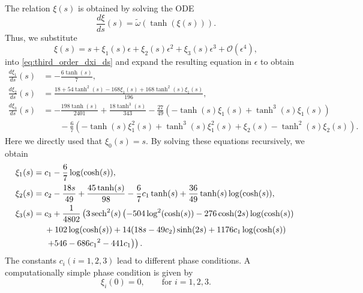 The relation $\xi(s)$ is obtained by solving the ODE
\begin{equation}
				\label{eq:third_order_dxi_ds}
				\frac{d\xi}{ds}(s) = \tilde \omega(\tanh(\xi(s))).
\end{equation}
Thus, we substitute 
\begin{equation*}
				\xi(s) = s + \xi_1(s)\epsilon + \xi_2(s)\epsilon^2
				+ \xi_3(s)\epsilon^3 + \mathcal{O}(\epsilon^4),
\end{equation*}
into \cref{eq:third_order_dxi_ds} and expand the resulting equation in
$\epsilon$ to obtain
\begin{align}
				\frac{d\xi_1}{ds}(s) &= -\frac{6\tanh(s)}{7}, 
            \label{eq:xi_1} \\
				\frac{d\xi_2}{ds}(s) &= \frac{18+54\tanh^2(s)
				-168\xi_1(s)+168\tanh^2(s)\xi_1(s)}{196},
            \label{eq:xi_2} \\
				\frac{d\xi_3}{ds}(s) &= -\frac{198 \tanh(s)}{2401}+
				\frac{18 \tanh^3(s)}{343}-\frac{27}{49}
				(-\tanh(s) \xi_1(s)+\tanh^3(s) \xi_1(s)) \nonumber \\
						& \qquad-\frac{6}{7} (-\tanh(s)
				\xi_1^2(s)+\tanh^3(s) \xi_1^2(s)+\xi_2(s)-\tanh^2(s) \xi_2(s)).
            \nonumber
\end{align}
Here we directly used that $\xi_0(s)=s$. By solving these equations recursively,
we obtain
\begin{equation*}
\begin{aligned}
    \xi_1(s) ={}& c_1 - \frac{6}{7}\log(\cosh(s)), \\
    \xi_2(s) ={}& c_2 -\frac{18 s}{49}+\frac{45 \tanh (s)}{98}-\frac{6}{7} c_1
             \tanh (s)+\frac{36}{49} \tanh (s) \log (\cosh(s)), \\
    \xi_3(s) ={}& c_3 + \frac{1}{4802}\left( 3 \operatorname{sech}^2(s) \left(-504 \log^2(\cosh
            (s))-276 \cosh (2 s) \log (\cosh (s)) \right.\right. \\
            {}& + 102 \log (\cosh (s))+14 (18 s-49 c_2) \sinh (2 s)+1176
                c_1 \log (\cosh (s)) \\
            {}& \left. \left. + 546-686 c_1{}^2-441 c_1\right) \right).
\end{aligned}
\end{equation*}
The constants $c_i (i=1,2,3)$ lead to different phase conditions.  A
computationally simple phase condition is given by
\begin{equation}
    \label{eq:xi_i}     
    \xi_i(0)=0,\qquad \mbox{for } i=1,2,3.
\end{equation}
